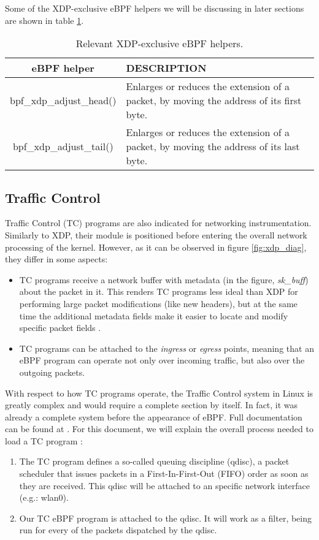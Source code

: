 Some of the XDP-exclusive eBPF helpers we will be discussing in later sections are shown in table \ref{table:xdp_helpers}.
\begin{table}[htbp]
\begin{tabular}{|c|>{\centering\arraybackslash}p{10cm}|}
\hline
eBPF helper & DESCRIPTION\\
\hline
\hline
bpf\_xdp\_adjust\_head() & Enlarges or reduces the extension of a packet, by moving the address of its first byte.\\
\hline
bpf\_xdp\_adjust\_tail() & Enlarges or reduces the extension of a packet, by moving the address of its last byte.\\
\hline
\end{tabular}
\caption{Relevant XDP-exclusive eBPF helpers.}
\label{table:xdp_helpers}
\end{table}


\subsection{Traffic Control} \label{subsection:tc}
Traffic Control (TC) programs are also indicated for networking instrumentation. Similarly to XDP, their module is positioned before entering the overall network processing of the kernel. However, as it can be observed in figure \ref{fig:xdp_diag}, they differ in some aspects:
\begin{itemize}
\item TC programs receive a network buffer with metadata (in the figure, \textit{sk\_buff}) about the packet in it. This renders TC programs less ideal than XDP for performing large packet modifications (like new headers), but at the same time the additional metadata fields make it easier to locate and modify specific packet fields \cite{tc_differences}.
\item TC programs can be attached to the \textit{ingress} or \textit{egress} points, meaning that an eBPF program can operate not only over incoming traffic, but also over the outgoing packets.
\end{itemize}

With respect to how TC programs operate, the Traffic Control system in Linux is greatly complex and would require a complete section by itself. In fact, it was already a complete system before the appearance of eBPF. Full documentation can be found at \cite{tc_docs_complete}. For this document, we will explain the overall process needed to load a TC program \cite{tc_direct_action}:
\begin{enumerate}
\item The TC program defines a so-called queuing discipline (qdisc), a packet scheduler that issues packets in a First-In-First-Out (FIFO) order as soon as they are received. This qdisc will be attached to an specific network interface (e.g.: wlan0).
\item Our TC eBPF program is attached to the qdisc. It will work as a filter, being run for every of the packets dispatched by the qdisc.
\end{enumerate}

